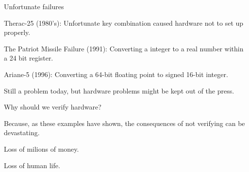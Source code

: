 \documentclass[13pt]{beamer}
\begin{document}
\begin{frame}{Unfortunate failures}
  \begin{block}{}
     Therac-25 (1980's): Unfortunate key combination caused hardware not to set up properly.
  \end{block}

  \pause

  \begin{block}{}
     The Patriot Missile Failure (1991): Converting a integer to a real number within a 24 bit register.
  \end{block}

  \pause

  \begin{block}{}
    Ariane-5 (1996): Converting a 64-bit floating point to signed 16-bit integer.
  \end{block}

  \pause

  \begin{block}{}
    Still a problem today, but hardware problems might be kept out of the press.
  \end{block}


\end{frame}


\begin{frame}{Why should we verify hardware?}
    \begin{block}{}
        Because, as these examples have shown, the consequences of not verifying can be devastating.
            \vspace{5mm}

        Loss of milions of money.
            \vspace{5mm}

        Loss of human life.
    \end{block}
\end{frame}
%
\end{document}
